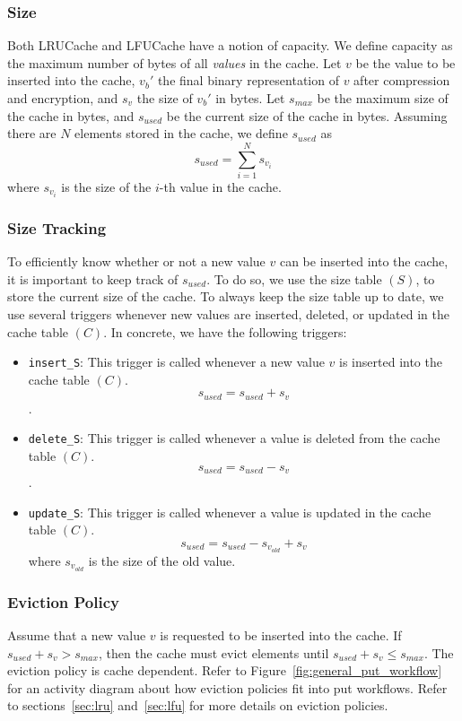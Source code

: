 \subsubsection{Size}
\label{sec:size_description}
Both LRUCache and LFUCache have a notion of capacity. We define capacity
as the maximum number of bytes of all \textit{values} in the cache.
Let $v$ be the value to be inserted into the cache, $v_b'$
the final binary representation of $v$ after compression and encryption,
and $s_v$ the size of $v_b'$ in bytes.
Let $s_{max}$ be the maximum size
of the cache in bytes, and $s_{used}$ be the current size of the cache in bytes. Assuming
there are $N$ elements stored in the cache, we define $s_{used}$
as $$ s_{used} = \sum_{i=1}^{N} s_{v_i}$$
where $s_{v_i}$ is the size of the $i$-th value in the cache.

\subsubsection{Size Tracking}
To efficiently know whether or not a new value $v$ can be inserted into the cache,
it is important to keep track of $s_{used}$. To do so, we use the size table $(S)$,
to store the current size of the cache. To always keep the size table up to date,
we use several triggers whenever new values are inserted, deleted, or
updated in the cache table $(C)$. In concrete, we have the following triggers:
\begin{itemize}
    \item \texttt{insert\_S}: This trigger is called whenever a new value $v$
        is inserted into the cache table $(C)$. $$s_{used} = s_{used} + s_v$$.
    \item \texttt{delete\_S}: This trigger is called whenever a value
        is deleted from the cache table $(C)$.
        $$s_{used} = s_{used} - s_v$$.
    \item \texttt{update\_S}: This trigger is called whenever a value
        is updated in the cache table $(C)$.
        $$s_{used} = s_{used} - s_{v_{old}} + s_v$$
        where $s_{v_{old}}$ is the size of the old value.
\end{itemize}

\subsubsection{Eviction Policy}
Assume that a new value $v$ is requested to be inserted into the cache.
If $s_{used} + s_v > s_{max}$, then the cache must evict elements
until $s_{used} + s_v \leq s_{max}$. The eviction policy is cache dependent.
Refer to
Figure~\ref{fig:general_put_workflow} for an activity
diagram about how eviction policies
fit into put workflows.
Refer to sections~\ref{sec:lru} and~\ref{sec:lfu} for more details
on eviction policies.

